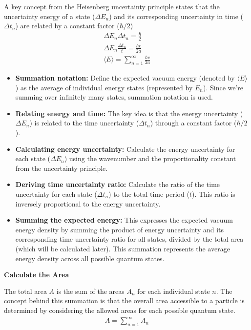 A key concept from the Heisenberg uncertainty principle states that 
the uncertainty energy of a state ($\Delta E_n$) and its corresponding uncertainty in time ($\Delta t_n$) are related by a constant factor ($\hbar/2$)
\begin{align}
    &\Delta E_n \Delta t_n = \frac{\hbar}{2}&\\
    &\Delta E_n \frac{\Delta t_n}{t} = \frac{\hbar c }{2 a}&\\
    &\langle E \rangle = \sum_{n=1}^{\infty} \frac{\hbar c }{2 a}&
\end{align}
\begin{itemize}
    \item \textbf{Summation notation:} Define the expected vacuum energy (denoted by $\langle E \rangle$ ) 
    as the average of individual energy states (represented by $E_n$). 
    Since we're summing over infinitely many states, summation notation is used.
    \item \textbf{Relating energy and time:} The key idea is that the energy uncertainty ($\Delta E_n$) is related 
    to the time uncertainty ($\Delta t_n$) through a constant factor ($\hbar/2$).
    \item \textbf{Calculating energy uncertainty:} Calculate the energy uncertainty for each state ($\Delta E_n$)
     using the wavenumber and the proportionality constant from the uncertainty principle.
    \item \textbf{Deriving time uncertainty ratio:} Calculate the ratio of the time uncertainty for each state ($\Delta t_n$)
     to the total time period ($t$). This ratio is inversely proportional to the energy uncertainty.
    \item \textbf{Summing the expected energy:} This expresses the expected vacuum energy density by summing 
    the product of energy uncertainty and its corresponding time uncertainty ratio for all states, 
    divided by the total area (which will be calculated later). 
    This summation represents the average energy density across all possible quantum states.
\end{itemize}
\noindent\textbf{Calculate the Area}
\par

The total area $A$ is the sum of the areas $A_n$ for each individual state $n$.
The concept behind this summation is that the overall area accessible to 
a particle is determined by considering the allowed areas for each possible quantum state.
\begin{align}
    A = \sum_{n=1}^{\infty}A_n
\end{align}


